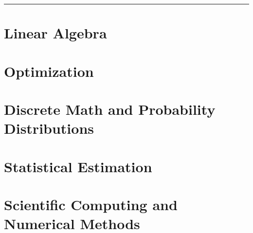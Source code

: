 \documentclass{article}
\begin{document}
	
	\setlength\abovedisplayskip{0.1cm}
	\setlength\belowdisplayskip{0.1cm}
	\setlength\abovedisplayshortskip{0.1cm}
	\setlength\belowdisplayshortskip{0.1cm}
	\raggedcolumns
	
	\begin{multicols*}{2}
		\setcounter{tocdepth}{1}
		\tableofcontents
		\thispagestyle{firstpage}
		
		\smallskip
		
		\hrule
		
		\columnbreak
		\vfill\null
		
		
		
		\columnbreak
		\section{Linear Algebra}
		
		\columnbreak
		\section{Optimization}
		
		\section{Discrete Math and Probability Distributions}
		
		\section{Statistical Estimation}
		
		\section{Scientific Computing and Numerical Methods}
		
	\end{multicols*}
\end{document}
